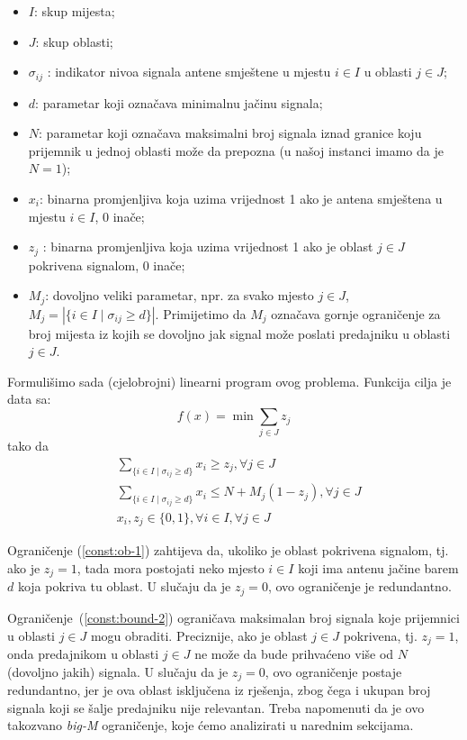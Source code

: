 \documentclass[b5paper, utf8, 11pt, colorlinks]{book}
\theoremstyle{definition}
\begin{document}
\begin{itemize}
	\item $I$: skup mijesta;
	\item $J$: skup oblasti;
	\item $\sigma_{ij}$ : indikator nivoa signala antene   smještene u mjestu $i \in I$ u oblasti $j \in J$;
	\item $d$: parametar koji označava minimalnu jačinu signala;
	\item $N$: parametar koji označava maksimalni broj signala iznad granice koju prijemnik u jednoj oblasti može da prepozna (u našoj instanci imamo da je $N=1$);
	\item $x_i$: binarna promjenljiva koja uzima vrijednost 1 ako je antena smještena u mjestu $i\in I$, 0 inače;
	\item  $z_j$ : binarna promjenljiva koja uzima vrijednost 1 ako je oblast $j \in J$ pokrivena signalom, 0 inače;
	\item $M_j$: dovoljno veliki parametar, npr. za svako mjesto $j \in J$, $M_j= |\{ i \in I \mid \sigma_{ij} \geq d\}|$. Primijetimo da $M_j$ označava gornje ograničenje za broj mijesta iz kojih se dovoljno jak signal može poslati predajniku u oblasti $j\in J$. 
\end{itemize}
Formulišimo sada (cjelobrojni) linearni program ovog problema. 
Funkcija cilja je data sa:
$$ f(x) = \min \sum_{j \in J} z_j $$
tako da
\begin{align}
	& \sum_{\{i \in I \mid \sigma_{ij} \geq d \}} x_i \geq z_j, \forall j \in J \label{const:ob-1}\\
	&\sum_{\{i \in I \mid \sigma_{ij} \geq d \}} x_i  \leq N + M_j( 1 - z_j), \forall j \in J \label{const:bound-2} \\ 
	& x_i, z_j \in\{0, 1\}, \forall i \in I, \forall j \in J   \label{const:vars-3}
\end{align}

Ograničenje (\ref{const:ob-1}) zahtijeva da, ukoliko je oblast pokrivena signalom, tj. ako je $z_j = 1$, tada mora postojati neko mjesto $i \in I$ koji ima antenu jačine barem $d$ koja pokriva tu oblast. U slučaju da je $z_j=0$, ovo ograničenje je redundantno. 

Ograničenje~(\ref{const:bound-2}) ograničava maksimalan broj signala koje prijemnici u oblasti $j\in J$ mogu obraditi. Preciznije, ako je oblast $j\in J$ pokrivena, tj. $z_j=1$, onda  predajnikom u oblasti $j \in J$ ne može da bude prihvaćeno više od $N$ (dovoljno jakih) signala. U slučaju da je $z_j = 0$, ovo ograničenje postaje redundantno, jer je ova oblast isključena iz rješenja, zbog čega i ukupan broj signala koji se šalje predajniku nije relevantan. Treba napomenuti da je ovo takozvano \emph{big-M} ograničenje, koje ćemo analizirati u narednim sekcijama.
\end{document}
